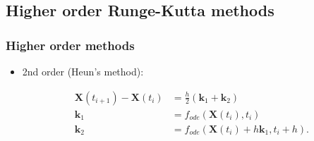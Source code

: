\documentclass{beamer}
\begin{document}
\subsection{Higher order Runge-Kutta methods}


\begin{frame}
\frametitle{Higher order methods}
\begin{itemize}

\item<1-> 2nd order (Heun's method):

\begin{align*}
\mathbf{X}(t_{i+1})-\mathbf{X}(t_{i}) &= \frac{h}{2}(\mathbf{k}_1+\mathbf{k}_2)\\
\mathbf{k}_1 &= f_{ode}(\mathbf{X}(t_i),t_i)\\
\mathbf{k}_2 &= f_{ode}(\mathbf{X}(t_i)+h\mathbf{k}_1,t_i+h).
\end{align*}

\end{itemize}
\end{frame}
\end{document}
